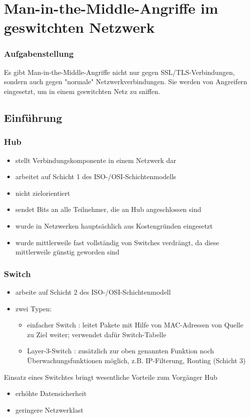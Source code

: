 \documentclass{beamer}
\begin{document}
    \section{Man-in-the-Middle-Angriffe im geswitchten Netzwerk}
    	
    	\begin{frame}
    		\frametitle{Aufgabenstellung}
    		Es gibt Man-in-the-Middle-Angriffe nicht nur gegen SSL/TLS-Verbindungen, sondern auch gegen "normale" Netzwerkverbindungen. Sie werden von Angreifern eingesetzt, um in einem geswitchten Netz zu sniffen.
        \end{frame}
        \subsection*{Einführung}
        \begin{frame}
        	\frametitle{Hub}
            \begin{itemize}
            \item stellt Verbindungskomponente in einem Netzwerk dar
            \item arbeitet auf Schicht 1 des ISO-/OSI-Schichtenmodells
            \item nicht zielorientiert
            \item sendet Bits an alle Teilnehmer, die an Hub angeschlossen sind
            \item wurde in Netzwerken hauptsächlich aus Kostengründen eingesetzt
            \item wurde mittlerweile fast vollständig von Switches verdrängt, da diese mittlerweile günstig geworden sind 
            \end{itemize}
        \end{frame}
        
        \begin{frame}
          	\frametitle{Switch}
            	\begin{itemize}
            	\item arbeite auf Schicht 2 des ISO-/OSI-Schichtenmodell
            	\item zwei Typen:
            	\begin{itemize}
            	\item einfacher Switch : leitet Pakete mit Hilfe von MAC-Adressen von Quelle zu Ziel weiter; verwendet dafür Switch-Tabelle
            	\item Layer-3-Switch : zusätzlich zur oben genannten Funktion noch Überwachungsfunktionen möglich, z.B. IP-Filterung, Routing (Schicht 3)
            	\end{itemize}
            	\end{itemize}
            	Einsatz eines Switchtes bringt wesentliche Vorteile zum Vorgänger Hub
            	\begin{itemize}
            		\item erhöhte Datensicherheit
            		\item geringere Netzwerklast	
            	\end{itemize}
        \end{frame}
        
\end{document}
